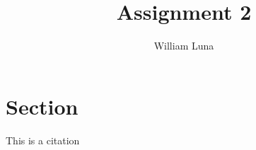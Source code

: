 \documentclass[
	letterpaper, %
]{jdf}
\author{William Luna}
\title{Assignment 2}
\begin{document}

\maketitle

\section{Section}
This is a citation \cite{joyner2016}
\end{document}
